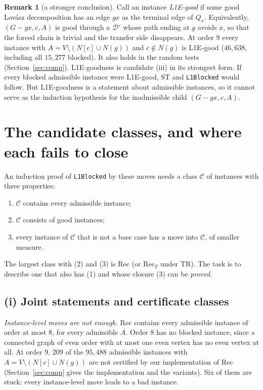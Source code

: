 \documentclass[11pt]{amsart}
\theoremstyle{definition}
\newtheorem{remark}[theorem]{Remark}
\newcommand{\cD}{\mathcal D}
\newcommand{\TR}{\mathrm{TR}}
\newcommand{\ST}{\mathrm{ST}}
\begin{document}
\begin{remark}[a stronger conclusion]\label{rem:l1e}
Call an instance \emph{L1E-good} if some good Lov\'asz decomposition has an edge $gx$ as the terminal
edge of $Q_x$. Equivalently, $(G-gx,c,A)$ is good through a $\cD'$ whose path ending at $g$ avoids
$x$, so that the forced chain is trivial and the transfer side disappears. At order $9$ every
instance with $A=V\setminus(N[c]\cup N(g))$ and $c\notin N(g)$ is L1E-good ($46{,}638$, including
all $15{,}277$ blocked). It also holds in the random tests (Section~\ref{sec:comp}). L1E-goodness is
candidate (iii) in its strongest form. If every blocked admissible instance were L1E-good, $\ST$ and
\texttt{L1Blocked} would follow. But L1E-goodness is a statement about admissible instances, so it
cannot serve as the induction hypothesis for the inadmissible child $(G-gx,c,A)$.
\end{remark}

\section{The candidate classes, and where each fails to close}\label{sec:candidates}

An induction proof of \texttt{L1Blocked} by these moves needs a class $\mathcal C$ of instances with
three properties:
\begin{enumerate}
\item $\mathcal C$ contains every admissible instance;
\item $\mathcal C$ consists of good instances;
\item every instance of $\mathcal C$ that is not a base case has a move into $\mathcal C$, of
smaller measure.
\end{enumerate}
The largest class with (2) and (3) is $\mathrm{Rec}$ (or $\mathrm{Rec}_T$ under $\TR$). The task is
to describe one that also has (1) and whose closure (3) can be \emph{proved}.

\subsection{(i) Joint statements and certificate classes}

\emph{Instance-level moves are not enough.} $\mathrm{Rec}$ contains every admissible instance of order
at most $8$, for every admissible $A$. Order $8$ has no blocked instance, since a connected graph of
even order with at most one even vertex has no even vertex at all. At order $9$, $209$ of the
$95{,}488$ admissible instances with $A=V\setminus(N[c]\cup N(g))$ are not certified by our
implementation of $\mathrm{Rec}$ (Section~\ref{sec:comp} gives the implementation and the variants).
Six of them are stuck: every instance-level move leads to a bad instance.
\end{document}
